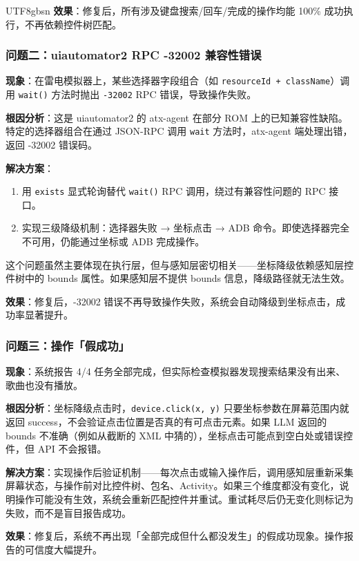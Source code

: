 \documentclass{article}
\begin{document}
\begin{CJK}{UTF8}{gbsn}
\textbf{效果}：修复后，所有涉及键盘搜索/回车/完成的操作均能 100\% 成功执行，不再依赖控件树匹配。

\subsubsection{问题二：uiautomator2 RPC -32002 兼容性错误}

\textbf{现象}：在雷电模拟器上，某些选择器字段组合（如 \texttt{resourceId + className}）调用 \texttt{wait()} 方法时抛出 \texttt{-32002} RPC 错误，导致操作失败。

\textbf{根因分析}：这是 uiautomator2 的 atx-agent 在部分 ROM 上的已知兼容性缺陷。特定的选择器组合在通过 JSON-RPC 调用 \texttt{wait} 方法时，atx-agent 端处理出错，返回 -32002 错误码。

\textbf{解决方案}：
\begin{enumerate}[leftmargin=1.5em]
  \item 用 \texttt{exists} 显式轮询替代 \texttt{wait()} RPC 调用，绕过有兼容性问题的 RPC 接口。
  \item 实现三级降级机制：选择器失败 → 坐标点击 → ADB 命令。即使选择器完全不可用，仍能通过坐标或 ADB 完成操作。
\end{enumerate}

这个问题虽然主要体现在执行层，但与感知层密切相关——坐标降级依赖感知层控件树中的 bounds 属性。如果感知层不提供 bounds 信息，降级路径就无法生效。

\textbf{效果}：修复后，-32002 错误不再导致操作失败，系统会自动降级到坐标点击，成功率显著提升。

\subsubsection{问题三：操作「假成功」}

\textbf{现象}：系统报告 4/4 任务全部完成，但实际检查模拟器发现搜索结果没有出来、歌曲也没有播放。

\textbf{根因分析}：坐标降级点击时，\texttt{device.click(x, y)} 只要坐标参数在屏幕范围内就返回 success，不会验证点击位置是否真的有可点击元素。如果 LLM 返回的 bounds 不准确（例如从截断的 XML 中猜的），坐标点击可能点到空白处或错误控件，但 API 不会报错。

\textbf{解决方案}：实现操作后验证机制——每次点击或输入操作后，调用感知层重新采集屏幕状态，与操作前对比控件树、包名、Activity。如果三个维度都没有变化，说明操作可能没有生效，系统会重新匹配控件并重试。重试耗尽后仍无变化则标记为失败，而不是盲目报告成功。

\textbf{效果}：修复后，系统不再出现「全部完成但什么都没发生」的假成功现象。操作报告的可信度大幅提升。


\end{CJK}
\end{document}
